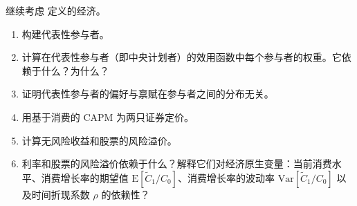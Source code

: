 \par\noindent\begin{minipage}{\linewidth}
\begin{problem}
 继续考虑 定义的经济。
\begin{enumerate}[label=(\alph*)]
    \item 构建代表性参与者。
    \item 计算在代表性参与者（即中央计划者）的效用函数中每个参与者的权重。它依赖于什么？为什么？
    \item 证明代表性参与者的偏好与禀赋在参与者之间的分布无关。
    \item 用基于消费的 CAPM 为两只证券定价。
    \item 计算无风险收益和股票的风险溢价。
    \item 利率和股票的风险溢价依赖于什么？解释它们对经济原生变量：当前消费水平、消费增长率的期望值 $\mathrm{E}[\tilde{C}_{1}/C_{0}]$、消费增长率的波动率 $\mathrm{Var}[\tilde{C}_{1}/C_{0}]$ 以及时间折现系数 $\rho$ 的依赖性？
\end{enumerate}
\end{problem}
\end{minipage}\par
{}
